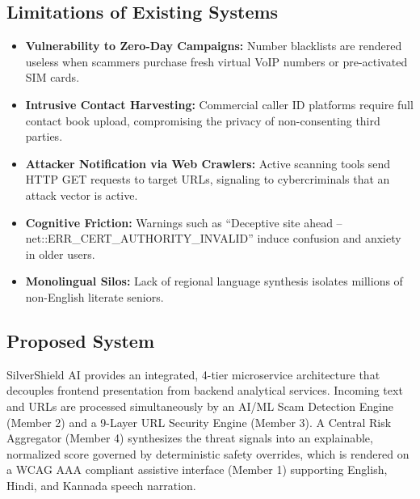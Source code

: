 \documentclass[conference]{IEEEtran}
\begin{document}
\subsection{Limitations of Existing Systems}
\begin{itemize}
    \item \textbf{Vulnerability to Zero-Day Campaigns:} Number blacklists are rendered useless when scammers purchase fresh virtual VoIP numbers or pre-activated SIM cards.
    \item \textbf{Intrusive Contact Harvesting:} Commercial caller ID platforms require full contact book upload, compromising the privacy of non-consenting third parties.
    \item \textbf{Attacker Notification via Web Crawlers:} Active scanning tools send HTTP GET requests to target URLs, signaling to cybercriminals that an attack vector is active.
    \item \textbf{Cognitive Friction:} Warnings such as ``Deceptive site ahead -- net::ERR\_CERT\_AUTHORITY\_INVALID'' induce confusion and anxiety in older users.
    \item \textbf{Monolingual Silos:} Lack of regional language synthesis isolates millions of non-English literate seniors.
\end{itemize}

\subsection{Proposed System}
SilverShield AI provides an integrated, 4-tier microservice architecture that decouples frontend presentation from backend analytical services. Incoming text and URLs are processed simultaneously by an AI/ML Scam Detection Engine (Member 2) and a 9-Layer URL Security Engine (Member 3). A Central Risk Aggregator (Member 4) synthesizes the threat signals into an explainable, normalized score governed by deterministic safety overrides, which is rendered on a WCAG AAA compliant assistive interface (Member 1) supporting English, Hindi, and Kannada speech narration.
\end{document}
